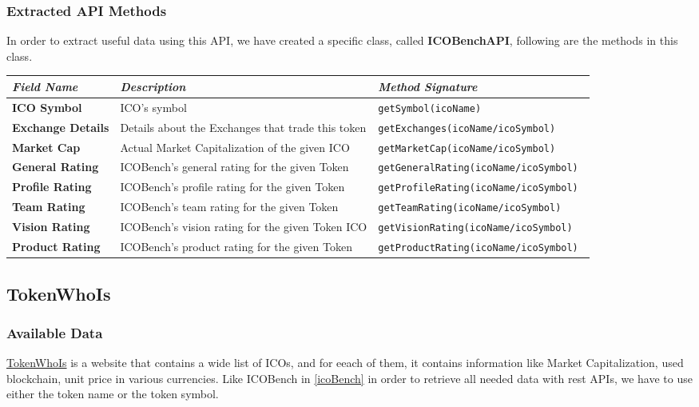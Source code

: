 \subsubsection{Extracted API Methods}

In order to extract useful data using this API, we have created a specific class, called \textbf{ICOBenchAPI}, following are the methods in this class.
\begin{center}
\begin{tabular}{| C{2cm} | C{4cm} | C{7cm} |} \hline
    \textit{Field Name} & \textit{Description} & \textit{Method Signature}\\ \hline 
    \textbf{ICO Symbol} & ICO's symbol & \texttt{getSymbol(icoName)}\\ \hline 
    \textbf{Exchange Details} & Details about the Exchanges that trade this token & \texttt{getExchanges(icoName/icoSymbol)}\\ \hline 
    \textbf{Market Cap} & Actual Market Capitalization of the given ICO &
    \texttt{getMarketCap(icoName/icoSymbol)}\\ \hline
    \textbf{General Rating} & ICOBench's general rating for the given Token &
    \texttt{getGeneralRating(icoName/icoSymbol)
    }\\ \hline
    \textbf{Profile Rating} & ICOBench's profile rating for the given Token &
    \texttt{getProfileRating(icoName/icoSymbol)}\\ \hline 
    \textbf{Team Rating} & ICOBench's team rating for the given Token &
    \texttt{getTeamRating(icoName/icoSymbol)}\\ \hline 
    \textbf{Vision Rating} & ICOBench's vision rating for the given Token ICO &
    \texttt{getVisionRating(icoName/icoSymbol)}\\ \hline 
    \textbf{Product Rating} & ICOBench's product rating for the given Token &
    \texttt{getProductRating(icoName/icoSymbol)}\\ \hline
\end{tabular}
\end{center}

\subsection{TokenWhoIs}
\subsubsection{Available Data}
\href{https://tokenwhois.com/}{TokenWhoIs} is a website that contains a wide list of ICOs, and for eeach of them, it contains information like Market Capitalization, used blockchain, unit price in various currencies. \newline
Like ICOBench in \ref{icoBench} in order to retrieve all needed data with rest APIs, we have to use  either the token name or the token symbol. 
